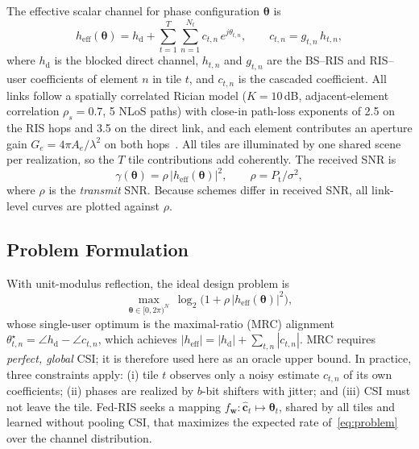 \documentclass[conference]{IEEEtran}
\newcommand{\fedris}{Fed-RIS}
\newcommand{\dB}{\,dB\xspace}
\begin{document}
The effective scalar channel for phase configuration $\bm{\theta}$ is
\begin{equation}
h_\text{eff}(\bm{\theta}) = h_\text{d} + \sum_{t=1}^{T}\sum_{n=1}^{N_t} c_{t,n}\, e^{j\theta_{t,n}},\qquad c_{t,n} = g_{t,n}\,h_{t,n},
\label{eq:heff}
\end{equation}
where $h_\text{d}$ is the blocked direct channel, $h_{t,n}$ and $g_{t,n}$ are the BS--RIS and RIS--user coefficients of element $n$ in tile $t$, and $c_{t,n}$ is the cascaded coefficient. All links follow a spatially correlated Rician model ($K=10$\dB, adjacent-element correlation $\rho_s=0.7$, 5 NLoS paths) with close-in path-loss exponents of 2.5 on the RIS hops and 3.5 on the direct link, and each element contributes an aperture gain $G_e=4\pi A_e/\lambda^2$ on both hops~\cite{tang2021}. All tiles are illuminated by one shared scene per realization, so the $T$ tile contributions add coherently. The received SNR is
\begin{equation}
\gamma(\bm{\theta}) = \rho\,|h_\text{eff}(\bm{\theta})|^2,\qquad \rho = P_\text{t}/\sigma^2 ,
\label{eq:snr}
\end{equation}
where $\rho$ is the \emph{transmit} SNR. Because schemes differ in received SNR, all link-level curves are plotted against $\rho$.

\subsection{Problem Formulation}

With unit-modulus reflection, the ideal design problem is
\begin{equation}
\max_{\bm{\theta}\in[0,2\pi)^N}\ \log_2\!\big(1+\rho\,|h_\text{eff}(\bm{\theta})|^2\big),
\label{eq:problem}
\end{equation}
whose single-user optimum is the maximal-ratio (MRC) alignment $\theta^\star_{t,n} = \angle h_\text{d} - \angle c_{t,n}$, which achieves $|h_\text{eff}| = |h_\text{d}| + \sum_{t,n}|c_{t,n}|$. MRC requires \emph{perfect, global} CSI; it is therefore used here as an oracle upper bound. In practice, three constraints apply: (i) tile $t$ observes only a noisy estimate $\hat{c}_{t,n}$ of its own coefficients; (ii) phases are realized by $b$-bit shifters with jitter; and (iii) CSI must not leave the tile. \fedris{} seeks a mapping $f_{\bm{w}}:\hat{\bm{c}}_t \mapsto \bm{\theta}_t$, shared by all tiles and learned without pooling CSI, that maximizes the expected rate of~\eqref{eq:problem} over the channel distribution.
\end{document}
